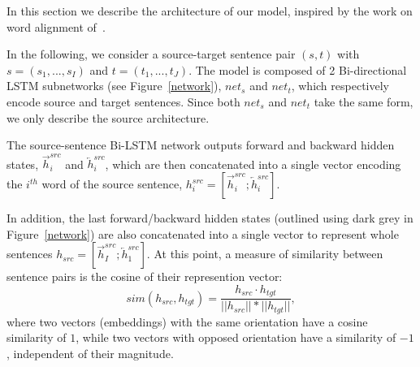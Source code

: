 \documentclass[11pt,a4paper]{article}
\begin{document}
In this section we describe the architecture of our model, inspired by the work on word alignment of~\citet{W16-2207}.
 
In the following, we consider a source-target sentence pair $(s,t)$
with $s=(s_1,...,s_I)$ and $t=(t_1,...,t_J)$. The model is composed of
2 Bi-directional LSTM subnetworks (see Figure~\ref{network}), $net_s$ and $net_t$, which respectively encode source and target sentences. Since both $net_s$ and $net_t$ take the same form, we only describe the source architecture.

The source-sentence Bi-LSTM network outputs forward and backward hidden states, $\overrightarrow{h}^{src}_i$ and $\overleftarrow{h}^{src}_i$, which are then concatenated into a single vector encoding the $i^{th}$ word of the source sentence, 
$h^{src}_i = [ \overrightarrow{h}^{src}_i ; \overleftarrow{h}^{src}_i ]$.

In addition, the last forward/backward hidden states (outlined using dark grey in Figure~\ref{network}) are also concatenated into a single vector  to represent whole sentences 
$h_{src} = [ \overrightarrow{h}^{src}_I ; \overleftarrow{h}^{src}_1 ]$.
At this point, a measure of similarity between sentence pairs is the
cosine of their represention vector: 
\begin{equation}
    sim(h_{src}, h_{tgt}) = \frac{h_{src} \cdotp h_{tgt}}{||h_{src}|| * ||h_{tgt}||},
    \label{cosine}
\end{equation}
\noindent where two vectors (embeddings) with the same orientation have a cosine similarity of $1$, while two vectors with opposed orientation have a similarity of $-1$, independent of their magnitude.
\end{document}
